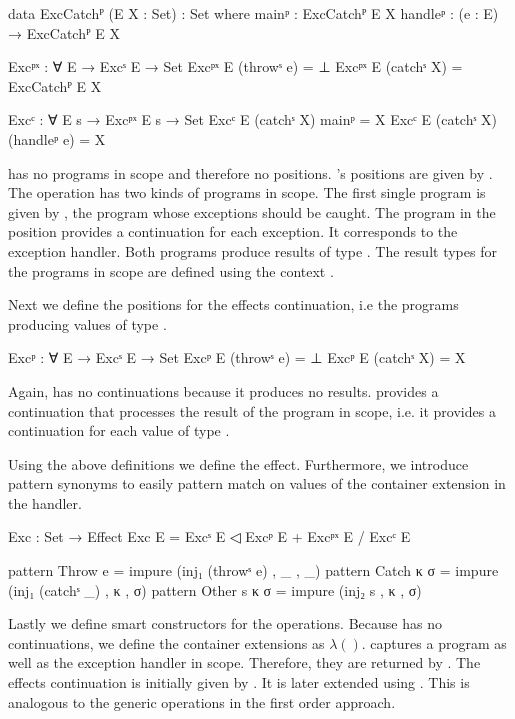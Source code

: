 \begin{code}
data ExcCatchᴾ (E X : Set) : Set where
  mainᵖ    : ExcCatchᴾ E X
  handleᵖ  : (e : E) → ExcCatchᴾ E X

Excᵖˣ : ∀ E → Excˢ E → Set
Excᵖˣ E (throwˢ e)  = ⊥
Excᵖˣ E (catchˢ X)  = ExcCatchᴾ E X

Excᶜ : ∀ E s → Excᵖˣ E s → Set
Excᶜ E (catchˢ X) mainᵖ        = X
Excᶜ E (catchˢ X) (handleᵖ e)  = X
\end{code}
 has no programs in scope and therefore no positions.
's positions are given by .
The operation has two kinds of programs in scope.
The first single program is given by , the
program whose exceptions should be caught.
The program in the  position provides a
continuation for each exception.
It corresponds to the exception handler.
Both programs produce results of type .
The result types for the programs in scope are defined using the context
.

Next we define the positions for the effects continuation, i.e the programs
producing values of type .

\begin{code}
Excᵖ : ∀ E → Excˢ E → Set
Excᵖ E (throwˢ e)  = ⊥
Excᵖ E (catchˢ X)  = X
\end{code}
Again,  has no continuations because it produces no
results.
 provides a continuation that processes the result of the
program in scope, i.e. it provides a continuation for each value of type
.

Using the above definitions we define the  effect.
Furthermore, we introduce pattern synonyms to easily pattern match on values of
the container extension in the handler.
\begin{code}
Exc : Set → Effect
Exc E = Excˢ E ◁ Excᵖ E + Excᵖˣ E / Excᶜ E

pattern Throw e      = impure (inj₁ (throwˢ e)  , _ ,  _)
pattern Catch κ σ    = impure (inj₁ (catchˢ _)  , κ ,  σ)
pattern Other s κ σ  = impure (inj₂ s           , κ ,  σ)
\end{code}
Lastly we define smart constructors for the operations.
Because  has no continuations, we define the container
extensions as $\lambda ()$.
 captures a program  as well as the
exception handler in scope.
Therefore, they are returned by .
The effects continuation  is initially given by
.
It is later extended using \AgdaFunction{>>=}.
This is analogous to the generic operations in the first order approach.

